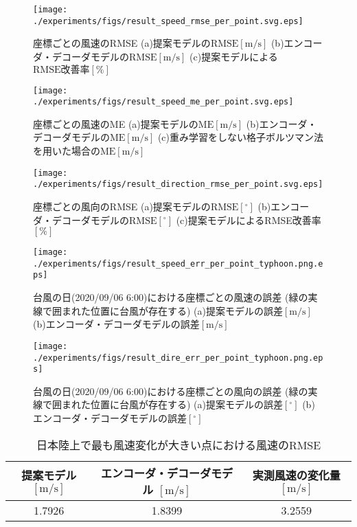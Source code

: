 \begin{figure}[bp]
  \centering
  \texttt{[image: ./experiments/figs/result\_speed\_rmse\_per\_point.svg.eps]}
  \caption{座標ごとの風速のRMSE (a)提案モデルの$\mathrm{RMSE[m/s]}$ (b)エンコーダ・デコーダモデルの$\mathrm{RMSE[m/s]}$ (c)提案モデルによる$\mathrm{RMSE改善率[\%]}$}
  \label{fig:exp-speed-rmse-per-point}
\end{figure}

\begin{figure}[bp]
  \centering
  \texttt{[image: ./experiments/figs/result\_speed\_me\_per\_point.svg.eps]}
  \caption{座標ごとの風速のME (a)提案モデルの$\mathrm{ME[m/s]}$ (b)エンコーダ・デコーダモデルの$\mathrm{ME[m/s]}$ (c)重み学習をしない格子ボルツマン法を用いた場合の$\mathrm{ME[m/s]}$}
  \label{fig:exp-speed-ma-per-point}
\end{figure}

\begin{figure}[bp]
  \centering
  \texttt{[image: ./experiments/figs/result\_direction\_rmse\_per\_point.svg.eps]}
  \caption{座標ごとの風向のRMSE (a)提案モデルの$\mathrm{RMSE[^\circ]}$ (b)エンコーダ・デコーダモデルの$\mathrm{RMSE[^\circ]}$ (c)提案モデルによるRMSE改善率$\mathrm{[\%]}$}
  \label{fig:exp-direction-rmse-per-point}
\end{figure}

\begin{figure}[bp]
  \centering
  \texttt{[image: ./experiments/figs/result\_speed\_err\_per\_point\_typhoon.png.eps]}
  \caption{台風の日(2020/09/06 6:00)における座標ごとの風速の誤差 (緑の実線で囲まれた位置に台風が存在する) (a)提案モデルの誤差$\mathrm{[m/s]}$ (b)エンコーダ・デコーダモデルの誤差$\mathrm{[m/s]}$}
  \label{fig:exp-speed-err-per-point-typhoon}
\end{figure}

\begin{figure}[bp]
  \centering
  \texttt{[image: ./experiments/figs/result\_dire\_err\_per\_point\_typhoon.png.eps]}
  \caption{台風の日(2020/09/06 6:00)における座標ごとの風向の誤差 (緑の実線で囲まれた位置に台風が存在する) (a)提案モデルの誤差$\mathrm{[^\circ]}$ (b)エンコーダ・デコーダモデルの誤差$\mathrm{[^\circ]}$}
  \label{fig:exp-direction-err-per-point-typhoon}
\end{figure}

\begin{table}[bp]
  \caption{日本陸上で最も風速変化が大きい点における風速のRMSE}
  \label{table:exp-max-diff-point-speed}
  \centering
  \begin{tabular}{ccc}
    \hline
    提案モデル $\mathrm{[m/s]}$ & エンコーダ・デコーダモデル $\mathrm{[m/s]}$ & 実測風速の変化量 $\mathrm{[m/s]}$ \\
    \hline
    1.7926 & 1.8399 & 3.2559 \\
    \hline
  \end{tabular}
\end{table}

